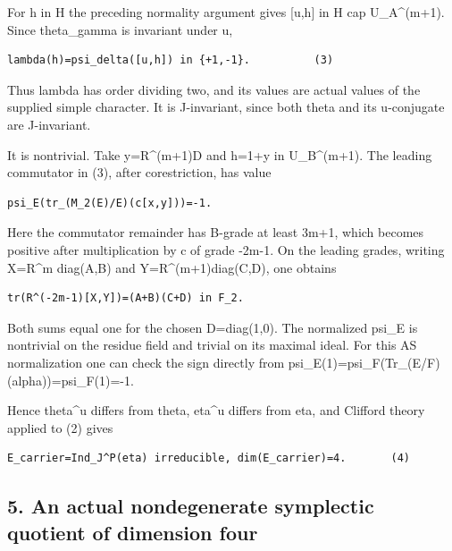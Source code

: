 For h in H the preceding normality argument gives {[}u,h{]} in H cap
U\_A\^{}(m+1). Since theta\_gamma is invariant under u,

\begin{Verbatim}[fontsize=\small,breaklines=true,breakanywhere=true]
lambda(h)=psi_delta([u,h]) in {+1,-1}.          (3)
\end{Verbatim}

Thus lambda has order dividing two, and its values are actual values of
the supplied simple character. It is J-invariant, since both theta and
its u-conjugate are J-invariant.

It is nontrivial. Take y=R\^{}(m+1)D and h=1+y in U\_B\^{}(m+1). The
leading commutator in (3), after corestriction, has value

\begin{Verbatim}[fontsize=\small,breaklines=true,breakanywhere=true]
psi_E(tr_(M_2(E)/E)(c[x,y]))=-1.
\end{Verbatim}

Here the commutator remainder has B-grade at least 3m+1, which becomes
positive after multiplication by c of grade -2m-1. On the leading
grades, writing X=R\^{}m diag(A,B) and Y=R\^{}(m+1)diag(C,D), one
obtains

\begin{Verbatim}[fontsize=\small,breaklines=true,breakanywhere=true]
tr(R^(-2m-1)[X,Y])=(A+B)(C+D) in F_2.
\end{Verbatim}

Both sums equal one for the chosen D=diag(1,0). The normalized psi\_E is
nontrivial on the residue field and trivial on its maximal ideal. For
this AS normalization one can check the sign directly from
psi\_E(1)=psi\_F(Tr\_(E/F)(alpha))=psi\_F(1)=-1.

Hence theta\^{}u differs from theta, eta\^{}u differs from eta, and
Clifford theory applied to (2) gives

\begin{Verbatim}[fontsize=\small,breaklines=true,breakanywhere=true]
E_carrier=Ind_J^P(eta) irreducible, dim(E_carrier)=4.       (4)
\end{Verbatim}

\hypertarget{rank4-an-actual-nondegenerate-symplectic-quotient-of-dimension-four}{%
\subsection{5. An actual nondegenerate symplectic quotient of dimension
four}\label{rank4-an-actual-nondegenerate-symplectic-quotient-of-dimension-four}}

